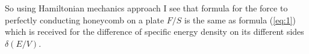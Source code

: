 \documentclass[twoside, 10pt]{article}
\begin{document}
\begin{multicols}{2}

    So using Hamiltonian mechanics approach I see that formula for the force
to perfectly conducting honeycomb on a plate \({F}/{S}\) is the same as formula (\ref{eq:1})
which is received for the difference of specific energy density on its
different sides \(\delta\left({E}/{V}\right)\).




\end{multicols}
\end{document}
